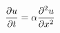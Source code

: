 \documentclass[preview]{standalone}
\begin{document}
\begin{align*}
{\partial u \over \partial t} = \alpha {\partial^2 u \over \partial x^2}
\end{align*}
\end{document}
